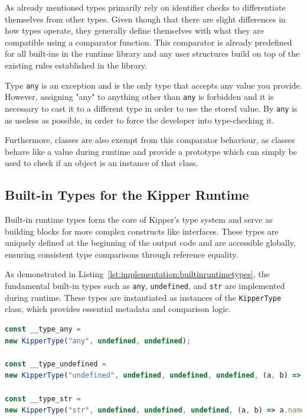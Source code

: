 As already mentioned types primarily rely on identifier checks to differentiate themselves from other types. Given though that there are slight differences in how types operate, they generally define themselves with what they are compatible using a comparator function. This comparator is already predefined for all built-ins in the runtime library and any user structures build on top of the existing rules established in the library.

Type \lstinline|any| is an exception and is the only type that accepts any value you provide. However, assigning "any" to anything other than \lstinline|any| is forbidden and it is necessary to cast it to a different type in order to use the stored value. By  \lstinline|any| is as useless as possible, in order to force the developer into type-checking it.

Furthermore, classes are also exempt from this comparator behaviour, as classes behave like a value during runtime and provide a prototype which can simply be used to check if an object is an instance of that class.

\subsection{Built-in Types for the Kipper Runtime}
\label{sec:builtintypes}

Built-in runtime types form the core of Kipper’s type system and serve as building blocks for more complex constructs like interfaces. These types are uniquely defined at the beginning of the output code and are accessible globally, ensuring consistent type comparisons through reference equality.

As demonstrated in Listing~\ref{lst:implementation:builtinruntimetypes}, the fundamental built-in types such as \lstinline|any|, \lstinline|undefined|, and \lstinline|str| are implemented during runtime. These types are instantiated as instances of the \lstinline|KipperType| class, which provides essential metadata and comparison logic.

\begin{lstlisting}[language=TypeScript,caption=Examples for the built-in runtime types,label=lst:implementation:builtinruntimetypes]
const __type_any =
new KipperType("any", undefined, undefined);

const __type_undefined =
new KipperType("undefined", undefined, undefined, undefined, (a, b) => a.name === b.name);

const __type_str =
new KipperType("str", undefined, undefined, undefined, (a, b) => a.name === b.name);
\end{lstlisting}

